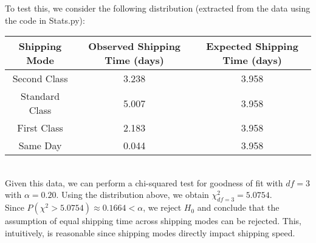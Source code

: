 \documentclass[11pt]{amsart}
\begin{document}
To test this, we consider the following distribution (extracted from the data using the code in Stats.py):
\begin{center}
\begin{tabular}{ |c|c|c| } 
 \hline
Shipping Mode & Observed Shipping Time (days)& Expected Shipping Time (days) \\ 
\hline
\hline
Second Class & 3.238 & 3.958\\
Standard Class & 5.007 & 3.958\\
First Class & 2.183 & 3.958\\
Same Day & 0.044 & 3.958\\
 \hline
\end{tabular}
\end{center}
\hfill \\
Given this data, we can perform a chi-squared test for goodness of fit with $df=3$ with $\alpha=0.20$. Using the distribution above, we obtain $\chi^2_{df=3}=5.0754$. \\

Since $P(\chi^2 > 5.0754) \approx 0.1664 < \alpha$, we reject $H_0$ and conclude that the assumption of equal shipping time across shipping modes can be rejected. This, intuitively, is reasonable since shipping modes directly impact shipping speed.
\end{document}
